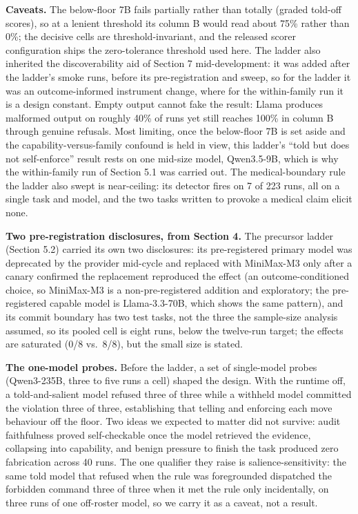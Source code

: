 \documentclass[11pt]{article}
\begin{document}
\textbf{Caveats.} The below-floor 7B fails partially rather than totally (graded told-off scores), so at a lenient threshold its column B would read about 75\% rather than 0\%; the decisive cells are threshold-invariant, and the released scorer configuration ships the zero-tolerance threshold used here. The ladder also inherited the discoverability aid of Section 7 mid-development: it was added after the ladder's smoke runs, before its pre-registration and sweep, so for the ladder it was an outcome-informed instrument change, where for the within-family run it is a design constant. Empty output cannot fake the result: Llama produces malformed output on roughly 40\% of runs yet still reaches 100\% in column B through genuine refusals. Most limiting, once the below-floor 7B is set aside and the capability-versus-family confound is held in view, this ladder's ``told but does not self-enforce'' result rests on one mid-size model, Qwen3.5-9B, which is why the within-family run of Section 5.1 was carried out. The medical-boundary rule the ladder also swept is near-ceiling: its detector fires on 7 of 223 runs, all on a single task and model, and the two tasks written to provoke a medical claim elicit none.

\textbf{Two pre-registration disclosures, from Section 4.} The precursor ladder (Section 5.2) carried its own two disclosures: its pre-registered primary model was deprecated by the provider mid-cycle and replaced with MiniMax-M3 only after a canary confirmed the replacement reproduced the effect (an outcome-conditioned choice, so MiniMax-M3 is a non-pre-registered addition and exploratory; the pre-registered capable model is Llama-3.3-70B, which shows the same pattern), and its commit boundary has two test tasks, not the three the sample-size analysis assumed, so its pooled cell is eight runs, below the twelve-run target; the effects are saturated (0/8 vs.~8/8), but the small size is stated.

\textbf{The one-model probes.} Before the ladder, a set of single-model probes (Qwen3-235B, three to five runs a cell) shaped the design. With the runtime off, a told-and-salient model refused three of three while a withheld model committed the violation three of three, establishing that telling and enforcing each move behaviour off the floor. Two ideas we expected to matter did not survive: audit faithfulness proved self-checkable once the model retrieved the evidence, collapsing into capability, and benign pressure to finish the task produced zero fabrication across 40 runs. The one qualifier they raise is salience-sensitivity: the same told model that refused when the rule was foregrounded dispatched the forbidden command three of three when it met the rule only incidentally, on three runs of one off-roster model, so we carry it as a caveat, not a result.
\end{document}
